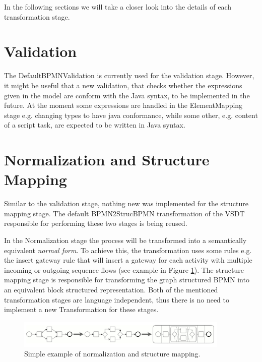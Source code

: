 In the following sections we will take a closer look into the details of each transformation stage.
\section{Validation}
The DefaultBPMNValidation is currently used for the validation stage. However, it might be useful that a new validation, that checks whether the expressions given in the model are conform with the Java syntax, to be implemented in the future. At the moment some expressions are handled in the ElementMapping stage e.g. changing types to have java conformance, while some other, e.g. content of a script task, are expected to be written in Java syntax. 

\section{Normalization and Structure Mapping}
Similar to the validation stage, nothing new was implemented for the structure mapping stage. The default BPMN2StrucBPMN transformation  of the VSDT responsible for performing these two stages is being reused. 

In the Normalization stage the process will be transformed into a semantically equivalent \textit{normal form}. To achieve this, the transformation uses some rules e.g. the insert gateway rule that will insert a gateway for each activity with multiple incoming or outgoing sequence flows (see example in Figure \ref{fig:n+s}). The structure mapping stage is responsible for transforming the graph structured BPMN into an equivalent block structured representation. Both of the mentioned transformation stages are language independent, thus there is no need to implement a new Transformation for these stages.

\begin{figure}[h]
	\centering	\includegraphics[width=0.9\textwidth]{images/structure_mapping.png}
	\caption{Simple example of normalization and structure mapping. \cite{TKAH08} }
	\label{fig:n+s}
\end{figure}


